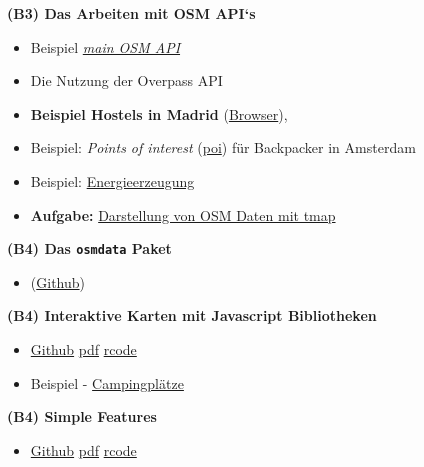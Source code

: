 \documentclass[ignorenonframetext,]{beamer}
\providecommand{\tightlist}{%
  \setlength{\itemsep}{0pt}\setlength{\parskip}{0pt}}
\begin{document}
\begin{frame}{\textbf{(B3) Das Arbeiten mit OSM API`s}}
\protect\hypertarget{b3-das-arbeiten-mit-osm-apis}{}

\begin{itemize}
\tightlist
\item
  Beispiel \href{slides/osm_mainapi.Rmd}{\emph{main OSM API}}
\item
  Die Nutzung der Overpass API
\item
  \textbf{Beispiel Hostels in Madrid}
  (\href{https://github.com/Japhilko/GeoData/blob/master/2016/slides/Madrid_hostels.Rmd}{Browser}),
\item
  Beispiel: \emph{Points of interest}
  (\href{https://rpossib.wordpress.com/2015/09/15/points-of-interest-for-backpackers/}{poi})
  für Backpacker in Amsterdam
\item
  Beispiel:
  \href{https://rpossib.wordpress.com/2015/11/20/use-openstreetmap-date/}{Energieerzeugung}
\item
  \textbf{Aufgabe:}
  \href{https://github.com/Japhilko/GeoData/blob/master/2016/tutorial/Aufgabe_osmar.Rmd}{Darstellung
  von OSM Daten mit tmap}
\end{itemize}

\end{frame}

\begin{frame}{\textbf{(B4) Das \texttt{osmdata} Paket}}
\protect\hypertarget{b4-das-osmdata-paket}{}

\begin{itemize}
\tightlist
\item
  (\href{slides/osmdata.md}{Github})
\end{itemize}

\end{frame}

\begin{frame}{\textbf{(B4) Interaktive Karten mit Javascript
Bibliotheken}}
\protect\hypertarget{b4-interaktive-karten-mit-javascript-bibliotheken}{}

\begin{itemize}
\tightlist
\item
  \href{slides/using_javascript.md}{Github} \textbar{}
  \href{slides/using_javascript.pdf}{pdf} \textbar{}
  \href{rcode/using_javascript.R}{rcode}
\item
  Beispiel - \href{http://rpubs.com/Japhilko82/Campsites}{Campingplätze}
\end{itemize}

\end{frame}

\begin{frame}{\textbf{(B4) Simple Features}}
\protect\hypertarget{b4-simple-features}{}

\begin{itemize}
\tightlist
\item
  \href{slides/simplefeatures.md}{Github} \textbar{}
  \href{slides/simplefeatures.pdf}{pdf} \textbar{}
  \href{rcode/simplefeatures.R}{rcode}
\end{itemize}

\end{frame}
\end{document}
